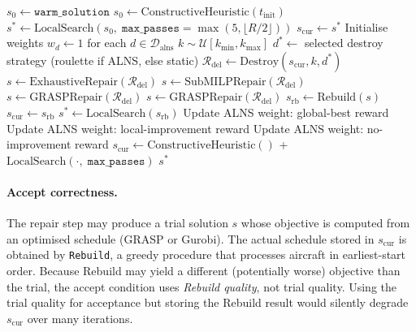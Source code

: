 \begin{algorithm}[H]
\caption{Large Neighbourhood Search (LNS / ALNS)}
\begin{algorithmic}[1]
    \State $s_0 \leftarrow \texttt{warm\_solution}$   
\Else
    \State $s_0 \leftarrow \text{ConstructiveHeuristic}(t_{\text{init}})$
\EndIf
\State $s^* \leftarrow \text{LocalSearch}(s_0,\; \texttt{max\_passes} = \max(5,\lfloor R/2\rfloor))$
\State $s_{\text{cur}} \leftarrow s^*$
    \State Initialise weights $w_d \leftarrow 1$ for each $d \in \mathcal{D}_{\text{alns}}$
\EndIf
{}
    \State $k \sim \mathcal{U}[k_{\min}, k_{\max}]$
    \State $d^* \leftarrow$ selected destroy strategy (roulette if ALNS, else static)
    \State $\mathcal{R}_{\text{del}} \leftarrow \text{Destroy}(s_{\text{cur}}, k, d^*)$
        \State $s \leftarrow \text{ExhaustiveRepair}(\mathcal{R}_{\text{del}})$
        \State $s \leftarrow \text{SubMILPRepair}(\mathcal{R}_{\text{del}})$
         $s \leftarrow \text{GRASPRepair}(\mathcal{R}_{\text{del}})$ \EndIf
    \Else
        \State $s \leftarrow \text{GRASPRepair}(\mathcal{R}_{\text{del}})$
    \EndIf
    \State $s_{\text{rb}} \leftarrow \text{Rebuild}(s)$   
       
        \State $s_{\text{cur}} \leftarrow s_{\text{rb}}$
            \State $s^* \leftarrow \text{LocalSearch}(s_{\text{rb}})$   
            \State Update ALNS weight: global-best reward
        \Else
            \State Update ALNS weight: local-improvement reward
        \EndIf
    \Else
        \State Update ALNS weight: no-improvement reward
    \EndIf
        \State $s_{\text{cur}} \leftarrow \text{ConstructiveHeuristic}()$
              + $\text{LocalSearch}(\cdot,\;\texttt{max\_passes})$
    \EndIf
\EndWhile
\State \Return $s^*$
\end{algorithmic}
\end{algorithm}

\paragraph{Accept correctness.}
The repair step may produce a trial solution $s$ whose objective is computed
from an optimised schedule (GRASP or Gurobi).  The actual schedule stored in
$s_{\text{cur}}$ is obtained by \texttt{Rebuild}, a greedy procedure that
processes aircraft in earliest-start order.  Because Rebuild may yield a
different (potentially worse) objective than the trial, the accept condition
uses \emph{Rebuild quality}, not trial quality.  Using the trial quality for
acceptance but storing the Rebuild result would silently degrade $s_{\text{cur}}$
over many iterations.

